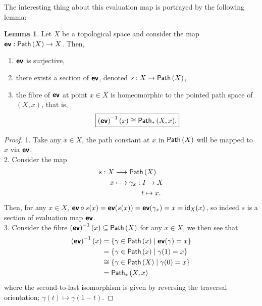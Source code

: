 \documentclass[letterpaper,11pt,twoside]{article}
\theoremstyle{definition}
\theoremstyle{definition}
\theoremstyle{definition}
\theoremstyle{definition}
\newtheorem{lemma}[proposition]{\textbf{Lemma}}
\theoremstyle{definition}
\theoremstyle{definition}
\theoremstyle{remark}
\theoremstyle{definition}
\newcommand{\isom}{\cong}
\newcommand{\id}[1]{{\fontfamily{lmss}\selectfont 
		\text{id}_{#1}
}}
\newcommand{\inv}[1]{\left(#1\right)^{-1}}
\newcommand{\upps}[1]{{\fontfamily{lmss}\selectfont 
		\text{Path}\left(#1\right)
}}
\newcommand{\pps}[1]{{\fontfamily{lmss}\selectfont 
		\text{Path}_{*}\left(#1\right)
}}
\newcommand{\ev}[0]{{\fontfamily{lmss}\selectfont 
        \textbf{ev}
}}
\begin{document}
    The interesting thing about this evaluation map is portrayed by the following lemma:
    \begin{lemma}\label{L-2.3.2}
        Let $X$ be a topological space and consider the map $\ev : \upps{X} \to X$. Then,
        \begin{enumerate}
            \item {$\ev$ is surjective,}
            \item {there exists a section of $\ev$, denoted $s : X\to \upps{X}$,}
            \item {the fibre of $\ev$ at point $x\in X$ is homeomorphic to the pointed path space of $(X,x)$, that is,
            \begin{align*}
                \boxed{\inv{\ev}(x) \isom \pps{X,x}.}
            \end{align*}
            }
        \end{enumerate}
    \end{lemma}
    \begin{proof}
        1. Take any $x\in X$, the path constant at $x$ in $\upps{X}$ will be mapped to $x$ via $\ev$.\\
        
        2. Consider the map
        \begin{align*}
            s : X&\longrightarrow \upps{X}\\
            x&\longmapsto \gamma_x : I\to X\\
            &\;\;\;\;\;\;\;\;\;\;\;\;\;\;t\mapsto x.
        \end{align*}
        Then, for any $x\in X$, $\ev\circ s(x) = \ev(s(x)) = \ev(\gamma_x) = x = \id{X}(x)$, so indeed $s$ is a section of evaluation map $\ev$.\\
        
        3. Consider the fibre $\inv{\ev}(x)\subseteq \upps{X}$ for any $x\in X$, we then see that
        \begin{align*}
            \inv{\ev}(x) &= \{\gamma \in \upps{x}\;\vert\; \ev(\gamma) = x\}\\
            &= \{\gamma \in \upps{x}\;\vert\; \gamma(1) = x\}\\
            &\isom \{\gamma \in \upps{X} \;\vert\; \gamma(0) =x\}\\
            &= \pps{X,x}
        \end{align*}
        where the second-to-last isomorphism is given by reversing the traversal orientation; $\gamma(t) \mapsto \gamma(1-t)$.
    \end{proof}
\end{document}

